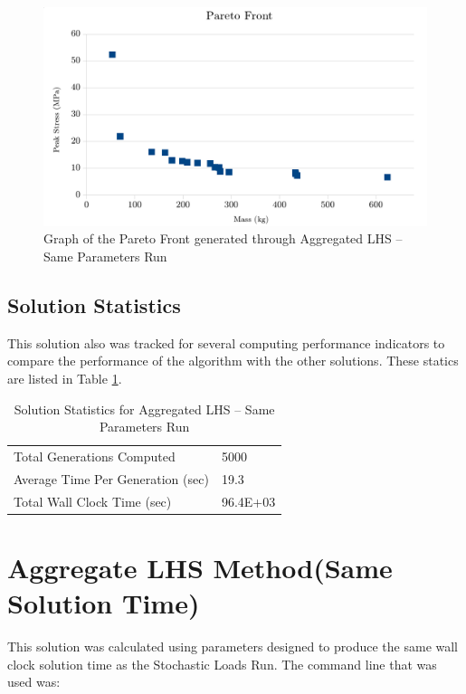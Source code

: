 \begin{figure}
\includegraphics[width=\textwidth]{img/s2i80g200_front.png}
\caption{Graph of the Pareto Front generated through Aggregated LHS -- Same Parameters Run}
\label{fig:pfront_agg_sameparam}
\end{figure}

\subsection{Solution Statistics}
This solution also was tracked for several computing performance indicators to compare the performance of the algorithm with the other solutions. These statics are listed in Table \ref{tab:stat_agg_sameparam}. 

\begin{table}[!htbp]
  \centering
  \begin{tabular}{|l|l|}
    \hline
	  Total Generations Computed & 5000\\
    Average Time Per Generation (sec) & 19.3\\
    Total Wall Clock Time (sec)	 & 96.4E+03\\
    \hline
  \end{tabular}
  \caption{Solution Statistics for Aggregated LHS -- Same Parameters Run}
  \label{tab:stat_agg_sameparam}
\end{table}

\section{Aggregate LHS Method(Same Solution Time)}
This solution was calculated using parameters designed to produce the same wall clock solution time as the Stochastic Loads Run. The command line that was used was:

